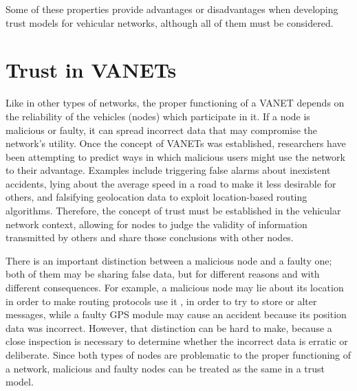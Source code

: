 Some of these properties provide advantages or disadvantages when developing trust models for vehicular networks, although all of them must be considered.

\section{Trust in VANETs}
\label{section:trustvanet}
Like in other types of networks, the proper functioning of a VANET depends on the reliability of the vehicles (nodes) which participate in it.
If a node is malicious or faulty, it can spread incorrect data that may compromise the network's utility.
Once the concept of VANETs was established, researchers have been attempting to predict ways in which malicious users might use the network to their advantage.
Examples include triggering false alarms about inexistent accidents, lying about the average speed in a road to make it less desirable for others, and falsifying geolocation data to exploit location-based routing algorithms.
Therefore, the concept of trust must be established in the vehicular network context, allowing for nodes to judge the validity of information transmitted by others and share those conclusions with other nodes.

There is an important distinction between a malicious node and a faulty one; both of them may be sharing false data, but for different reasons and with different consequences.
For example, a malicious node may lie about its location in order to make routing protocols use it \citep{leinmuller2005influence}, in order to try to store or alter messages, while a faulty GPS module may cause an accident because its position data was incorrect.
However, that distinction can be hard to make, because a close inspection is necessary to determine whether the incorrect data is erratic or deliberate.
Since both types of nodes are problematic to the proper functioning of a network, malicious and faulty nodes can be treated as the same in a trust model.


